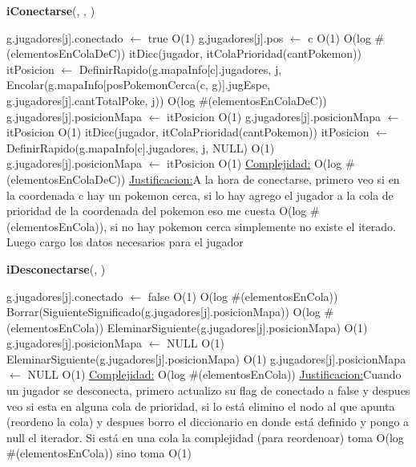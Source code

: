 \begin{Algoritmos}
\begin{algorithm}[H]{\textbf{iConectarse}(, , )}
	\begin{algorithmic}[1]
		\State g.jugadores[j].conectado $\gets$ true \Comment O(1)
		\State g.jugadores[j].pos $\gets$ c \Comment O(1)
		 \Comment O(log $\#$(elementosEnColaDeC))
			\State itDicc(jugador, itColaPrioridad(cantPokemon)) itPosicion $\gets$ DefinirRapido(g.mapaInfo[c].jugadores, j, Encolar(g.mapaInfo[posPokemonCerca(c, g)].jugEspe, g.jugadores[j].cantTotalPoke, j)) \Comment O(log $\#$(elementosEnColaDeC))
			\State g.jugadores[j].posicionMapa $\gets$ itPosicion \Comment O(1)			
			\State g.jugadores[j].posicionMapa $\gets$ itPosicion \Comment O(1)		
		\Else
			\State itDicc(jugador, itColaPrioridad(cantPokemon)) itPosicion $\gets$ DefinirRapido(g.mapaInfo[c].jugadores, j, NULL) \Comment O(1)
			\State g.jugadores[j].posicionMapa $\gets$ itPosicion \Comment O(1)			
		\EndIf		
		\medskip
		\Statex \underline{Complejidad:} O(log $\#$(elementosEnColaDeC))
		\Statex \underline{Justificacion:}A la hora de conectarse, primero veo si en la coordenada c hay un pokemon cerca, si lo hay agrego el jugador a la cola de prioridad de la coordenada del pokemon eso me cuesta O(log $\#$(elementosEnCola)), si no hay pokemon cerca simplemente no existe el iterado. Luego cargo los datos necesarios para el jugador  
	\end{algorithmic}
\end{algorithm}

\begin{algorithm}[H]{\textbf{iDesconectarse}(, )}
	\begin{algorithmic}[1]
		\State g.jugadores[j].conectado $\gets$ false \Comment O(1)
		 \Comment O(log $\#$(elementosEnCola))
			\State Borrar(SiguienteSignificado(g.jugadores[j].posicionMapa)) \Comment O(log $\#$(elementosEnCola))
			\State EleminarSiguiente(g.jugadores[j].posicionMapa) \Comment O(1)
			\State g.jugadores[j].posicionMapa $\gets$ NULL \Comment O(1)		
		\Else
			\State EleminarSiguiente(g.jugadores[j].posicionMapa) \Comment O(1)
			\State g.jugadores[j].posicionMapa $\gets$ NULL \Comment O(1)
		\EndIf		
		\medskip
		\Statex \underline{Complejidad:} O(log $\#$(elementosEnCola))
		\Statex \underline{Justificacion:}Cuando un jugador se desconecta, primero actualizo su flag de conectado a false y despues veo si esta en alguna cola de prioridad, si lo está elimino el nodo al que apunta (reordeno la cola) y despues borro el diccionario en donde está definido y pongo a null el iterador. Si está en una cola la complejidad (para reordenoar) toma O(log $\#$(elementosEnCola)) sino toma O(1)  
	\end{algorithmic}
\end{algorithm}


\end{Algoritmos}
